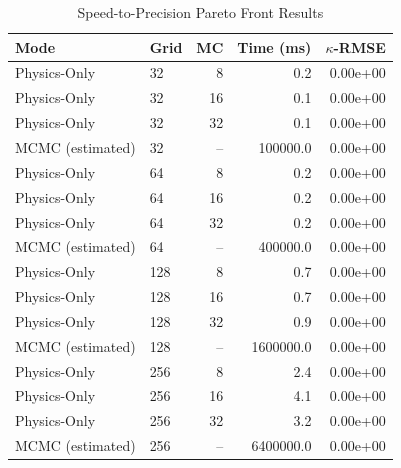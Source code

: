 \begin{table}[htbp]
  \centering
  \caption{Speed-to-Precision Pareto Front Results}
  \label{tab:pareto}
  \begin{tabular}{llrrr}
    \hline
    Mode & Grid & MC & Time (ms) & $\kappa$-RMSE \\
    \hline
    Physics-Only & 32 & 8 & 0.2 & 0.00e+00 \\
    Physics-Only & 32 & 16 & 0.1 & 0.00e+00 \\
    Physics-Only & 32 & 32 & 0.1 & 0.00e+00 \\
    MCMC (estimated) & 32 & -- & 100000.0 & 0.00e+00 \\
    Physics-Only & 64 & 8 & 0.2 & 0.00e+00 \\
    Physics-Only & 64 & 16 & 0.2 & 0.00e+00 \\
    Physics-Only & 64 & 32 & 0.2 & 0.00e+00 \\
    MCMC (estimated) & 64 & -- & 400000.0 & 0.00e+00 \\
    Physics-Only & 128 & 8 & 0.7 & 0.00e+00 \\
    Physics-Only & 128 & 16 & 0.7 & 0.00e+00 \\
    Physics-Only & 128 & 32 & 0.9 & 0.00e+00 \\
    MCMC (estimated) & 128 & -- & 1600000.0 & 0.00e+00 \\
    Physics-Only & 256 & 8 & 2.4 & 0.00e+00 \\
    Physics-Only & 256 & 16 & 4.1 & 0.00e+00 \\
    Physics-Only & 256 & 32 & 3.2 & 0.00e+00 \\
    MCMC (estimated) & 256 & -- & 6400000.0 & 0.00e+00 \\
    \hline
  \end{tabular}
\end{table}
